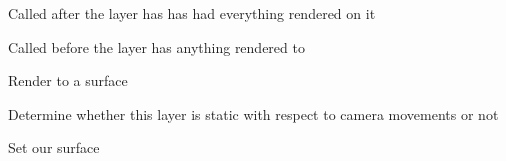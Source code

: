 \documentclass[letterpaper,10pt,english]{sphinxmanual}
\begin{document}
\begin{fulllineitems}
\begin{fulllineitems}
\end{fulllineitems}


\begin{fulllineitems}
\label{renderering:serge.render.RenderingLayer.postRender}
Called after the layer has has had everything rendered on it

\end{fulllineitems}


\begin{fulllineitems}
\label{renderering:serge.render.RenderingLayer.preRender}
Called before the layer has anything rendered to

\end{fulllineitems}


\begin{fulllineitems}
\label{renderering:serge.render.RenderingLayer.render}
Render to a surface

\end{fulllineitems}


\begin{fulllineitems}
\label{renderering:serge.render.RenderingLayer.setStatic}
Determine whether this layer is static with respect to camera movements or not

\end{fulllineitems}


\begin{fulllineitems}
\label{renderering:serge.render.RenderingLayer.setSurface}
Set our surface

\end{fulllineitems}


\end{fulllineitems}
\end{document}
